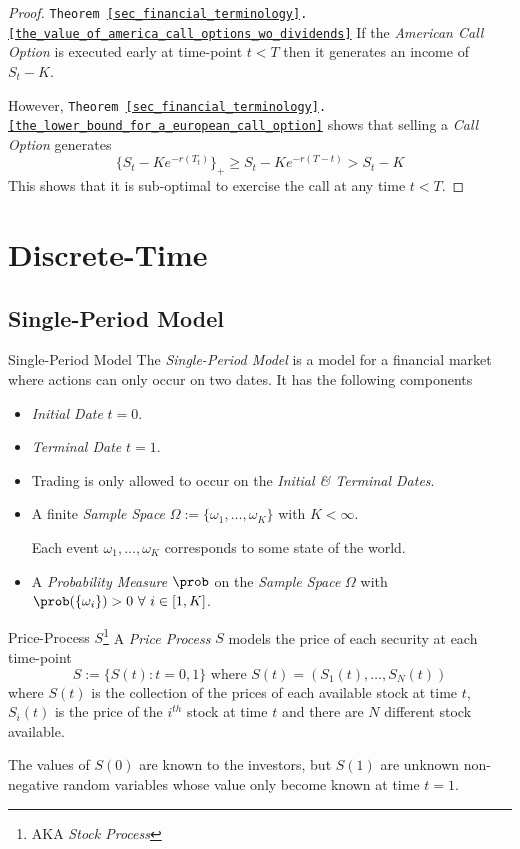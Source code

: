 \documentclass[11pt,a4paper]{article}
\begin{document}
  \begin{proof}{\texttt{Theorem \ref{sec_financial_terminology}.\ref{the_value_of_america_call_options_wo_dividends}}}
    If the \textit{American Call Option} is executed early at time-point $t<T$ then it generates an income of $S_t-K$.
    \par However, \texttt{Theorem \ref{sec_financial_terminology}.\ref{the_lower_bound_for_a_european_call_option}} shows that selling a \textit{Call Option} generates
    \[ \{S_t-Ke^{-r(T_t)}\}_+\geq S_t-Ke^{-r(T-t)}>S_t-K \]
    This shows that it is sub-optimal to exercise the call at any time $t<T$.
  \end{proof}

\section{Discrete-Time}\label{sec_discrete_time_models}

\subsection{Single-Period Model}

  \begin{definition}{Single-Period Model}
    The \textit{Single-Period Model} is a model for a financial market where actions can only occur on two dates. It has the following components
    \begin{itemize}
      \item \textit{Initial Date} $t=0$.
      \item \textit{Terminal Date} $t=1$.
      \item Trading is only allowed to occur on the \textit{Initial \& Terminal Dates}.
      \item A finite \textit{Sample Space} $\Omega:=\{\omega_1,\dots,\omega_K\}$ with $K<\infty$.
      \par Each event $\omega_1,\dots,\omega_K$ corresponds to some state of the world.
      \item A \textit{Probability Measure} $\prob$ on the \textit{Sample Space} $\Omega$ with $\prob(\{\omega_i\})>0\ \forall\ i\in[1,K]$.
    \end{itemize}
  \end{definition}

  \begin{definition}{Price-Process $S$\footnote{AKA \textit{Stock Process}}}\label{def_price_process}
    A \textit{Price Process} $S$ models the price of each security at each time-point
    \[ S:=\{S(t):t=0,1\}\text{ where }S(t)=(S_1(t),\dots,S_N(t)) \]
    where $S(t)$ is the collection of the prices of each available stock at time $t$, $S_i(t)$ is the price of the $i^{th}$ stock at time $t$ and there are $N$ different stock available.
    \par The values of $S(0)$ are known to the investors, but $S(1)$ are unknown non-negative random variables whose value only become known at time $t=1$.
  \end{definition}
\end{document}
